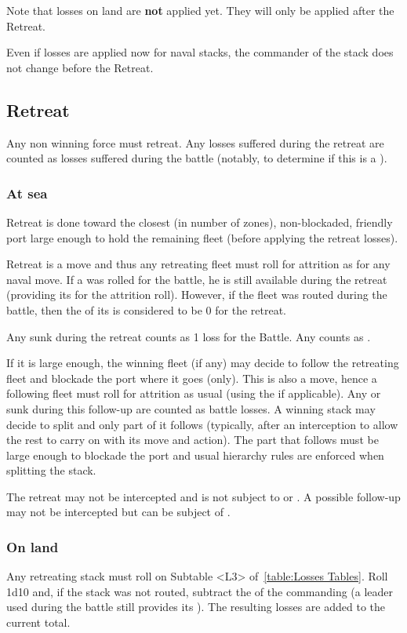 Note that losses on land are \textbf{not} applied yet. They will only be
applied after the Retreat.

Even if losses are applied now for naval stacks, the commander of the stack
does not change before the Retreat.

\subsection{Retreat}
\label{chMilitary:Battle:Retreat}
Any non winning force must retreat. Any losses suffered during the retreat are
counted as losses suffered during the battle (notably, to determine if this is
a ).

\subsubsection{At sea}
Retreat is done toward the closest (in number of zones), non-blockaded,
friendly port large enough to hold the remaining fleet (before applying the
retreat losses).

Retreat is a move and thus any retreating fleet must roll for attrition as for
any naval move. If a  \LeaderA was rolled for the battle,
he is still available during the retreat (providing its \Man for the attrition
roll). However, if the fleet was routed during the battle, then the \Man of
its \LeaderA is considered to be 0 for the retreat.

Any \ND sunk during the retreat counts as 1 loss for the Battle. Any \NDE
counts as \texttu.

If it is large enough, the winning fleet (if any) may decide to follow the
retreating fleet and blockade the port where it goes (only). This is also a
move, hence a following fleet must roll for attrition as usual (using the
 \LeaderA if applicable). Any \ND or \NDE sunk during this
follow-up are counted as battle losses. A winning stack may decide to split
and only part of it follows (typically, after an interception to allow the
rest to carry on with its move and action). The part that follows must be
large enough to blockade the port and usual hierarchy rules are enforced when
splitting the stack.

The retreat may not be intercepted and is not subject to \Presidios or
\StraitFort. A possible follow-up may not be intercepted but can be subject of
\StraitFort.

\subsubsection{On land}
Any retreating stack must roll on Subtable <L3> of~\ref{table:Losses
  Tables}. Roll 1d10 and, if the stack was not routed, subtract the \Man of
the commanding \LeaderG (a  leader used during the battle
still provides its \Man). The resulting losses are added to the current total.


